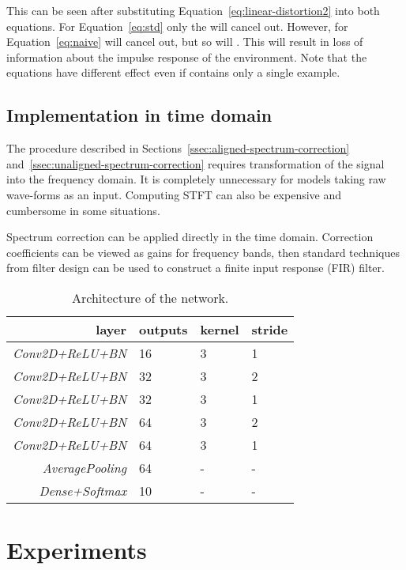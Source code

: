 \documentclass[a4paper]{article}
\begin{document}
This can be seen after substituting Equation~\eqref{eq:linear-distortion2} into both equations. 
For Equation~\eqref{eq:std} only the  will cancel out. However, for Equation~\eqref{eq:naive}  will cancel out, but so will .
This will result in loss of information about the impulse response of the environment.
Note that the equations have different effect even if  contains only a single example.

\subsection{Implementation in time domain}
\label{ssec:fir}

The procedure described in Sections~\ref{ssec:aligned-spectrum-correction} and~\ref{ssec:unaligned-spectrum-correction} requires transformation of the signal into the frequency domain. It is completely unnecessary for models taking raw wave-forms as an input. Computing STFT can also be expensive and cumbersome in some situations.

Spectrum correction can be applied directly in the time domain. Correction coefficients can be viewed as gains for frequency bands, then standard techniques from filter design can be used to construct a finite input response (FIR) filter.

\begin{table}[t]
\centering
\caption{Architecture of the network.}
\begin{tabular}{@{}rlll@{}}
\toprule
\textbf{layer} & \textbf{outputs} & \textbf{kernel} & \textbf{stride} \\ \midrule
\textit{Conv2D+ReLU+BN} & 16 & 3 & 1 \\
\textit{Conv2D+ReLU+BN} & 32 & 3 & 2 \\
\textit{Conv2D+ReLU+BN} & 32 & 3 & 1 \\
\textit{Conv2D+ReLU+BN} & 64 & 3 & 2 \\
\textit{Conv2D+ReLU+BN} & 64 & 3 & 1 \\
\textit{AveragePooling} & 64 & - & - \\
\textit{Dense+Softmax} & 10 & - & - \\ \bottomrule
\end{tabular}
\label{tab:model}
\end{table}

\section{Experiments}
\label{sec:experiments}
\end{document}
